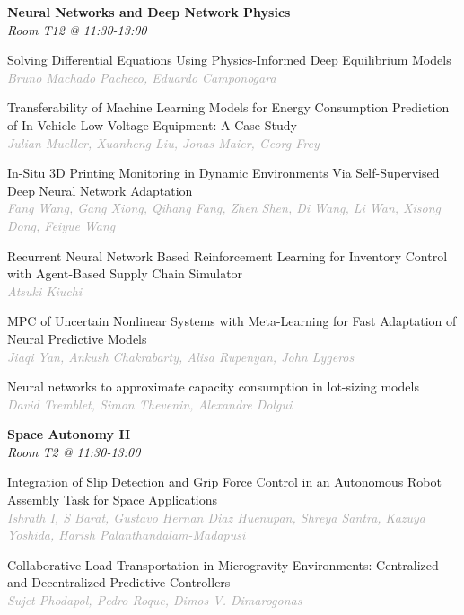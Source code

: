 \begin{multicols*}{2}
\normalsize \textbf{Neural Networks and Deep Network Physics}\\
\small \textit{Room T12 @ 11:30-13:00}

\small Solving Differential Equations Using Physics-Informed Deep Equilibrium Models\\ 
\footnotesize \textcolor{darkgray}{\textit{Bruno Machado Pacheco, Eduardo  Camponogara}}

\small Transferability of Machine Learning Models for Energy Consumption Prediction of In-Vehicle Low-Voltage Equipment: A Case Study\\ 
\footnotesize \textcolor{darkgray}{\textit{Julian Mueller, Xuanheng  Liu, Jonas  Maier, Georg  Frey}}

\small In-Situ 3D Printing Monitoring in Dynamic Environments Via Self-Supervised Deep Neural Network Adaptation\\ 
\footnotesize \textcolor{darkgray}{\textit{Fang Wang, Gang  Xiong, Qihang  Fang, Zhen  Shen, Di  Wang, Li  Wan, Xisong  Dong, Feiyue  Wang}}

\small Recurrent Neural Network Based Reinforcement Learning for Inventory Control with Agent-Based Supply Chain Simulator\\ 
\footnotesize \textcolor{darkgray}{\textit{Atsuki Kiuchi}}

\small MPC of Uncertain Nonlinear Systems with Meta-Learning for Fast Adaptation of Neural Predictive Models\\ 
\footnotesize \textcolor{darkgray}{\textit{Jiaqi Yan, Ankush  Chakrabarty, Alisa  Rupenyan, John  Lygeros}}

\small Neural networks to approximate capacity consumption in lot-sizing models\\ 
\footnotesize \textcolor{darkgray}{\textit{David Tremblet, Simon  Thevenin, Alexandre  Dolgui}}

\normalsize \textbf{Space Autonomy II}\\
\small \textit{Room T2 @ 11:30-13:00}

\small Integration of Slip Detection and Grip Force Control in an Autonomous Robot Assembly Task for Space Applications\\ 
\footnotesize \textcolor{darkgray}{\textit{Ishrath I, S  Barat, Gustavo Hernan  Diaz Huenupan, Shreya  Santra, Kazuya  Yoshida, Harish  Palanthandalam-Madapusi}}

\small Collaborative Load Transportation in Microgravity Environments: Centralized and Decentralized Predictive Controllers\\ 
\footnotesize \textcolor{darkgray}{\textit{Sujet Phodapol, Pedro  Roque, Dimos V.  Dimarogonas}}


\end{multicols*}

